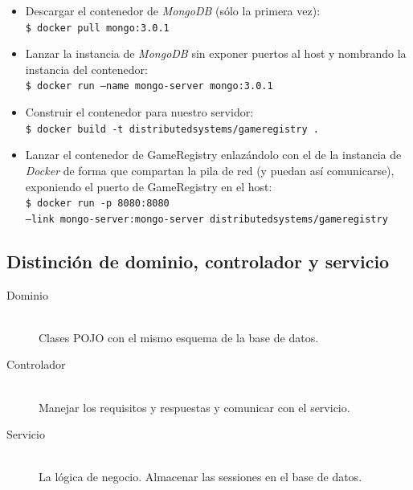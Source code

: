 \begin{itemize}
 \item Descargar el contenedor de \emph{MongoDB} (sólo la primera vez): \\
       \texttt{\$ docker pull mongo:3.0.1}
 \item Lanzar la instancia de \emph{MongoDB} sin exponer puertos al host y nombrando la instancia del contenedor: \\
       \texttt{\$ docker run --name mongo-server mongo:3.0.1}
 \item Construir el contenedor para nuestro servidor: \\
       \texttt{\$ docker build -t distributedsystems/gameregistry .}
 \item Lanzar el contenedor de GameRegistry enlazándolo con el de la instancia de \emph{Docker} de forma
       que compartan la pila de red (y puedan así comunicarse), exponiendo el puerto de GameRegistry en el host: \\
       \texttt{\$ docker run -p 8080:8080  \\--link mongo-server:mongo-server distributedsystems/gameregistry}
\end{itemize}

\subsection{Distinción de dominio, controlador y servicio}
\begin{description}
  \item[Dominio] \hfill \\
  Clases POJO con el mismo esquema de la base de datos.
  \item[Controlador] \hfill \\
  Manejar los requisitos y respuestas y comunicar con el servicio.
  \item[Servicio] \hfill \\
  La lógica de negocio. Almacenar las sessiones en el base de datos.
\end{description}


